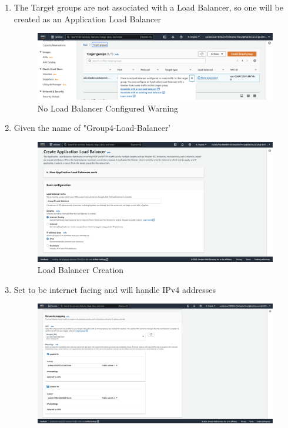 \begin{enumerate}
	\item The Target groups are not associated with a Load Balancer, so one will be created as an Application Load Balancer\nolinebreak
	      \begin{figure}[H]
	      	\centering
	      	\includegraphics[width=\textwidth]{resources/elb/elb-load-balancer-creation.png}
	      	\caption{No Load Balancer Configured Warning}
	      	\label{fig:elb-load-bal-create}
	      \end{figure}
	\item Given the name of "Group4-Load-Balancer' \begin{figure}[H]
													   \centering
													   \includegraphics[width=\textwidth]{resources/elb/elb-basic-config.png}
													   \caption{Load Balancer Creation}
													   \label{fig:elb-creation-config}
	\end{figure}
	\item Set to be internet facing and will handle IPv4 addresses \begin{figure}[H]
	      \centering
	      \includegraphics[width=\textwidth]{resources/elb/elb-network-mapping.png}

\end{figure}
\end{enumerate}
